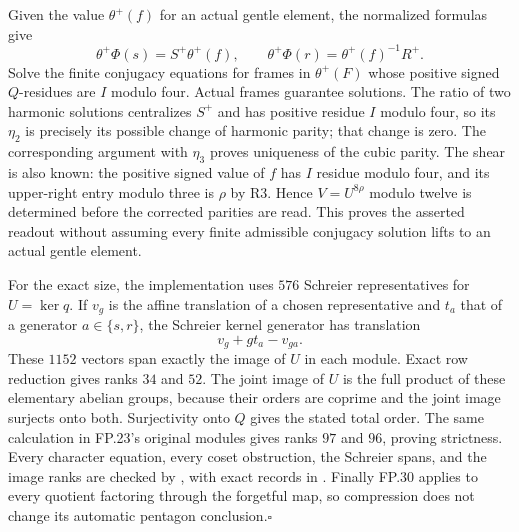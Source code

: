 Given the value $\theta^+(f)$ for an actual gentle element,
the normalized formulas give
\[
 \theta^+\Phi(s)=S^+\theta^+(f),\qquad
 \theta^+\Phi(r)=\theta^+(f)^{-1}R^+.
\]
Solve the finite conjugacy equations for frames in $\theta^+(F)$
whose positive signed $Q$-residues are $I$ modulo four.
Actual frames guarantee solutions.  The ratio of two harmonic
solutions centralizes $S^+$ and has positive residue $I$
modulo four, so its $\eta_2$ is precisely its possible change
of harmonic parity; that change is zero.  The corresponding
argument with $\eta_3$ proves uniqueness of the cubic parity.
The shear is also known: the positive signed value of $f$
has $I$ residue modulo four, and its upper-right entry modulo
three is $\rho$ by R3.  Hence $V=U^{8\rho}$ modulo twelve
is determined before the corrected parities are read.
This proves the asserted readout without assuming every finite
admissible conjugacy solution lifts to an actual gentle element.

For the exact size, the implementation uses $576$ Schreier
representatives for $U=\ker q$.  If $v_g$ is the affine
translation of a chosen representative and $t_a$ that of a
generator $a\in\{s,r\}$, the Schreier kernel generator has
translation
\[
 v_g+g t_a-v_{ga}.
\]
These $1152$ vectors span exactly the image of $U$ in each
module.  Exact row reduction gives ranks $34$ and $52$.
The joint image of $U$ is the full product of these elementary
abelian groups, because their orders are coprime and the joint
image surjects onto both.  Surjectivity onto $Q$ gives the
stated total order.  The same calculation in FP.23's original
modules gives ranks $97$ and $96$, proving strictness.
Every character equation, every coset obstruction, the Schreier
spans, and the image ranks are checked by
,
with exact records in
.
Finally FP.30 applies to every quotient factoring through the
forgetful map, so compression does not change its automatic
pentagon conclusion.\hfill$\square$
